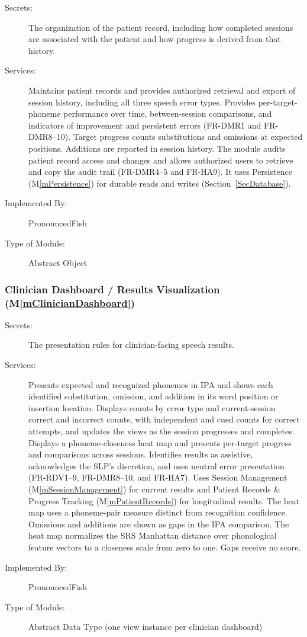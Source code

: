 \documentclass[12pt, titlepage]{article}
\newcommand{\mref}[1]{M\ref{#1}}
\begin{document}
\begin{description}
\item[Secrets:] The organization of the patient record, including
how completed sessions are associated with the patient and how progress is
derived from that history.
\item[Services:] Maintains patient records and provides authorized retrieval and
export of session history, including all three speech error types. Provides
per-target-phoneme performance over time, between-session comparisons,
and indicators of improvement and persistent errors (FR-DMR1 and
FR-DMR8--10). Target progress counts substitutions and omissions at expected
positions. Additions are reported in session history. The module audits
patient record access and changes
and allows authorized users to retrieve and copy the audit trail
(FR-DMR4--5 and FR-HA9). It uses
Persistence (\mref{mPersistence}) for durable reads and writes
(Section~\ref{SecDatabase}).
\item[Implemented By:] PronouncedFish
\item[Type of Module:] Abstract Object
\end{description}

\subsubsection{Clinician Dashboard / Results Visualization (\mref{mClinicianDashboard})}

\begin{description}
\item[Secrets:] The presentation rules for clinician-facing speech results.
\item[Services:] Presents expected and recognized phonemes in IPA and shows
each identified substitution, omission, and addition in its word position or
insertion location. Displays counts by error type and current-session
correct and incorrect counts, with independent and cued counts for correct
attempts, and updates the views as the session progresses and completes.
Displays a phoneme-closeness heat map and presents per-target progress and
comparisons across sessions. Identifies results as assistive, acknowledges
the SLP's discretion, and uses neutral error presentation (FR-RDV1--9,
FR-DMR8--10, and FR-HA7). Uses Session Management
(\mref{mSessionManagement}) for current results and Patient Records \&
Progress Tracking (\mref{mPatientRecords}) for longitudinal results. The
heat map uses a phoneme-pair measure distinct from recognition confidence.
Omissions and additions are shown as gaps in the IPA comparison.
The heat map normalizes the SRS Manhattan distance over phonological feature
vectors to a closeness scale from zero to one. Gaps receive no score.
\item[Implemented By:] PronouncedFish
\item[Type of Module:] Abstract Data Type (one view instance per clinician
dashboard)
\end{description}
\end{document}
